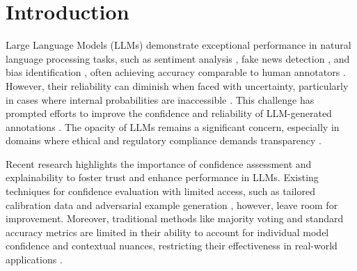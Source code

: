 
\section{Introduction}



Large Language Models (LLMs) demonstrate exceptional performance in natural language processing tasks, such as sentiment analysis \cite{zhang-etal-2024-sentiment}, fake news detection \cite{golob2024fact}, and bias identification \cite{kumar2024decoding}, often achieving accuracy comparable to human annotators \cite{Gligoric2024CanUL}. However, their reliability can diminish when faced with uncertainty, particularly in cases where internal probabilities are inaccessible \cite{liu2024examining}. This challenge has prompted efforts to improve the confidence and reliability of LLM-generated annotations \cite{becker2024cycles, gligoric2024can}. The opacity of LLMs remains a significant concern, especially in domains where ethical and regulatory compliance demands transparency \cite{castelvecchi2021can, jobin2019global}. 

Recent research \cite{geng-etal-2024-survey, luo2024understanding} highlights the importance of confidence assessment and explainability to foster trust and enhance performance in LLMs. Existing techniques for confidence evaluation with limited access, such as tailored calibration data and adversarial example generation \cite{pedapati2024large}, however, leave room for improvement. Moreover, traditional methods like majority voting and standard accuracy metrics are limited in their ability to account for individual model confidence and contextual nuances, restricting their effectiveness in real-world applications \cite{wang2019superglue}. 

